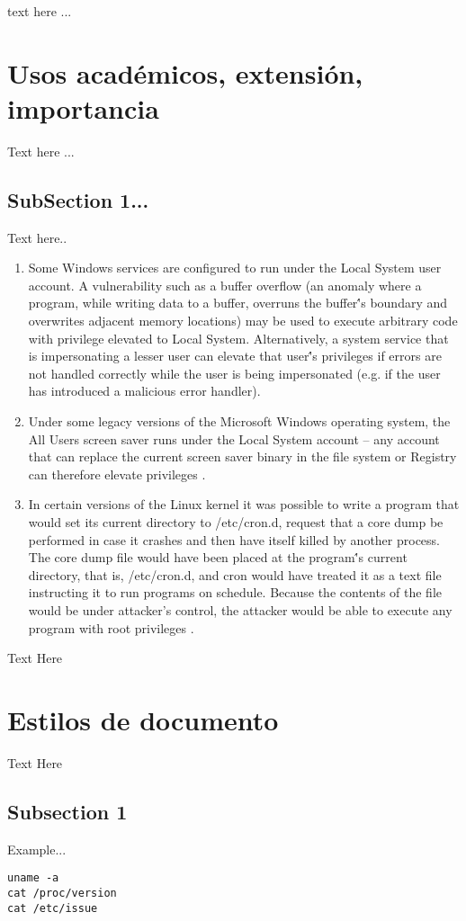 \documentclass[letterpaper, 10pt, journal]{IEEEtran}
\begin{document}
text here ...

\section{Usos acad\'emicos, extensi\'on, importancia}
Text here ...

\subsection{SubSection 1...}
Text here..
\begin{enumerate}
\item	Some Windows services are configured to run under the Local System user account. A vulnerability such as a buffer overflow (an anomaly where a program, while writing data to a buffer, overruns the buffer\''s boundary and overwrites adjacent memory locations) may be used to execute arbitrary code with privilege elevated to Local System. Alternatively, a system service that is impersonating a lesser user can elevate that user\''s privileges if errors are not handled correctly while the user is being impersonated (e.g. if the user has introduced a malicious error handler)\cite{[6]}.
\item	Under some legacy versions of the Microsoft Windows operating system, the All Users screen saver runs under the Local System account – any account that can replace the current screen saver binary in the file system or Registry can therefore elevate privileges \cite{[6]}.
\item	In certain versions of the Linux kernel it was possible to write a program that would set its current directory to /etc/cron.d, request that a core dump be performed in case it crashes and then have itself killed by another process. The core dump file would have been placed at the program\''s current directory, that is, /etc/cron.d, and cron would have treated it as a text file instructing it to run programs on schedule. Because the contents of the file would be under attacker’s control, the attacker would be able to execute any program with root privileges \cite{[3]}.
\end{enumerate}
Text Here

\section{Estilos de documento}
Text Here
\subsection{Subsection 1}
Example...
\lstset{language=Java}
\begin{lstlisting}
uname -a
cat /proc/version
cat /etc/issue
\end{lstlisting}
\end{document}
